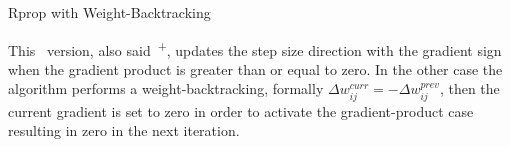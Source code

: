 \begin{subsection}{Rprop with Weight-Backtracking}
    \par This~ version, also said~\textsuperscript{+}, updates the step size direction with the gradient sign when the gradient product is greater than or equal to zero. In the other case the algorithm performs a weight-backtracking, formally $\Delta w_{ij}^{curr} = -\Delta w_{ij}^{prev}$, then the current gradient is set to zero in order to activate the gradient-product case resulting in zero in the next iteration.
    
    \clearpage
\end{subsection}